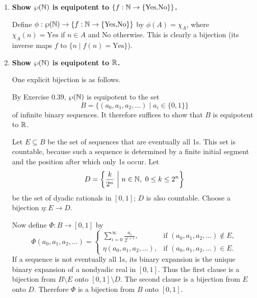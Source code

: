 \begin{enumerate}[{0.}1. ]
Now define $f:\NN\to\QN$ by
\[
f(0)=0,\qquad
f(2n-1)=h(n),\qquad
f(2n)=-h(n)\quad(n\ge 1).
\]
Then $f$ lists $0$, followed by the pairs $h(n),-h(n)$ of positive and
negative rationals:
\[
0,\ h(1),\ -h(1),\ h(2),\ -h(2),\ldots
\]
Hence $f$ is a bijection from $\NN$ onto $\QN$, so $\NN$ and $\QN$ are equipotent.

\item \textbf{Show $\wp(\mathbb{N})$ is equipotent to $\{f:\mathbb{N}\to\{\text{Yes,No}\}\}$.}

Define $\phi: \wp(\mathbb{N})\to\{f:\mathbb{N}\to\{\text{Yes,No}\}\}$ by $\phi(A) = \chi_A$, where $\chi_A(n)=\text{Yes}$ if $n\in A$ and $\text{No}$ otherwise. This is clearly a bijection (its inverse maps $f$ to $\{n\mid f(n)=\text{Yes}\}$).

\item \textbf{Show $\wp(\mathbb{N})$ is equipotent to $\mathbb{R}$.}

One explicit bijection is as follows.

By Exercise 0.39, $\wp(\mathbb{N})$ is equipotent to the set
\[
B=\{(a_0,a_1,a_2,\ldots)\mid a_i\in\{0,1\}\}
\]
of infinite binary sequences. It therefore suffices to show that $B$ is equipotent
to $\mathbb{R}$.

Let $E\subseteq B$ be the set of sequences that are eventually all 1s. This set is
countable, because such a sequence is determined by a finite initial segment and
the position after which only 1s occur. Let
\[
D=\left\{\frac{k}{2^n}\ \middle|\ n\in\mathbb{N},\ 0\le k\le 2^n\right\}
\]
be the set of dyadic rationals in $[0,1]$; $D$ is also countable. Choose a
bijection $\eta:E\to D$.

Now define $\Phi:B\to[0,1]$ by
\[
\Phi(a_0,a_1,a_2,\ldots)=
\begin{cases}
\displaystyle \sum_{i=0}^{\infty}\frac{a_i}{2^{i+1}}, & \text{if }(a_0,a_1,a_2,\ldots)\notin E,\\[1.2ex]
\eta(a_0,a_1,a_2,\ldots), & \text{if }(a_0,a_1,a_2,\ldots)\in E.
\end{cases}
\]
If a sequence is not eventually all 1s, its binary expansion is the unique binary
expansion of a nondyadic real in $[0,1]$. Thus the first clause is a bijection
from $B\setminus E$ onto $[0,1]\setminus D$. The second clause is a bijection from
$E$ onto $D$. Therefore $\Phi$ is a bijection from $B$ onto $[0,1]$.


\end{enumerate}
